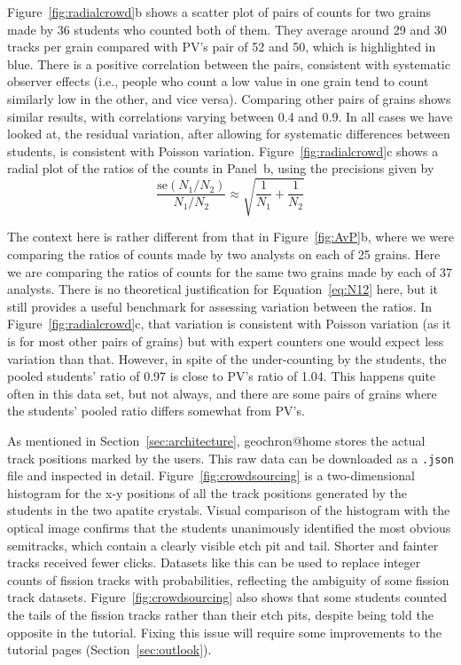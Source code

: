 \documentclass[gchron, manuscript]{copernicus}
\begin{document}
Figure~\ref{fig:radialcrowd}b shows a scatter plot of pairs of counts
for two grains made by 36 students who counted both of them. They
average around 29 and 30 tracks per grain compared with PV's pair of
52 and 50, which is highlighted in blue. There is a positive
correlation between the pairs, consistent with systematic observer
effects (i.e., people who count a low value in one grain tend to count
similarly low in the other, and vice versa).  Comparing other pairs of
grains shows similar results, with correlations varying between 0.4
and 0.9. In all cases we have looked at, the residual variation, after
allowing for systematic differences between students, is consistent
with Poisson variation.  Figure~\ref{fig:radialcrowd}c shows a radial
plot of the ratios of the counts in Panel~b, using the precisions
given by
\begin{equation}
  \frac{\mbox{se}(N_1/N_2)}{N_1/N_2}
  \approx
  \sqrt{
    \frac{1}{N_1} + \frac{1}{N_2}
  }
  \label{eq:N12}
\end{equation}

The context here is rather different from that in
Figure~\ref{fig:AvP}b, where we were comparing the ratios of counts
made by two analysts on each of 25 grains. Here we are comparing the
ratios of counts for the same two grains made by each of 37
analysts. There is no theoretical justification for
Equation~\ref{eq:N12} here, but it still provides a useful benchmark
for assessing variation between the ratios. In
Figure~\ref{fig:radialcrowd}c, that variation is consistent with
Poisson variation (as it is for most other pairs of grains) but with
expert counters one would expect less variation than that. However, in
spite of the under-counting by the students, the pooled students'
ratio of 0.97 is close to PV's ratio of 1.04. This happens quite often
in this data set, but not always, and there are some pairs of grains
where the students' pooled ratio differs somewhat from PV's.
\medskip

As mentioned in Section~\ref{sec:architecture}, geochron@home stores
the actual track positions marked by the users. This raw data can be
downloaded as a \texttt{.json} file and inspected in detail.
Figure~\ref{fig:crowdsourcing} is a two-dimensional histogram for the
x-y positions of all the track positions generated by the students in
the two apatite crystals. Visual comparison of the histogram with the
optical image confirms that the students unanimously identified the
most obvious semitracks, which contain a clearly visible etch pit and
tail. Shorter and fainter tracks received fewer clicks. Datasets like
this can be used to replace integer counts of fission tracks with
probabilities, reflecting the ambiguity of some fission track
datasets. Figure~\ref{fig:crowdsourcing} also shows that some students
counted the tails of the fission tracks rather than their etch pits,
despite being told the opposite in the tutorial. Fixing this issue
will require some improvements to the tutorial pages
(Section~\ref{sec:outlook}).\medskip
\end{document}
